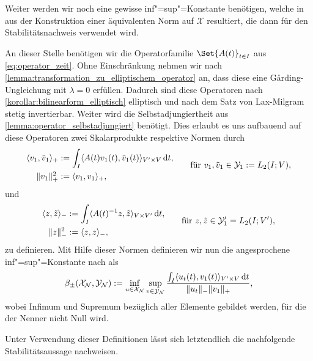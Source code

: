 \documentclass[../main.tex]{subfiles}
\begin{document}
Weiter werden wir noch eine gewisse inf"=sup"=Konstante benötigen, welche in \cite[57]{Andreev:2012ep} aus der Konstruktion einer äquivalenten Norm auf $\mathcal X$ resultiert, die dann für den Stabilitätsnachweis \cite[Theorem 5.2.6]{Andreev:2012ep} verwendet wird.

An dieser Stelle benötigen wir die Operatorfamilie $\Set{A(t)}_{t \in I}$ aus \cref{eq:operator_zeit}.
Ohne Einschränkung nehmen wir nach \cref{lemma:transformation_zu_elliptischem_operator} an, dass diese eine G\aa{}rding-Ungleichung mit $\lambda = 0$ erfüllen.
Dadurch sind diese Operatoren nach \cref{korollar:bilinearform_elliptisch} elliptisch und nach dem Satz von Lax-Milgram \cite[Section 6.2.1]{evans2010partial} stetig invertierbar.
Weiter wird die Selbstadjungiertheit aus \cref{lemma:operator_selbstadjungiert} benötigt.
Dies erlaubt es uns aufbauend auf diese Operatoren zwei Skalarprodukte respektive Normen durch
\begin{equation}
    \begin{aligned}
        \langle v_{1},\tilde{v}_{1}\rangle_{+} &:= \int_{I} \langle A(t)v_{1}(t),\tilde{v}_{1}(t)\rangle_{V' \times V} \mathop{}\!\mathrm{d} t, \\
         \lVert v_{1}\rVert^{2}_{+} &:= \langle v_{1},v_{1}\rangle_{+},
    \end{aligned}
    \qquad \text{für } v_{1}, \tilde{v}_{1} \in \mathcal Y_{1} := L_{2}(I; V),
\end{equation}
und
\begin{equation}
    \begin{aligned}
        \langle z,\tilde{z}\rangle_{-} &:= \int_{I} \langle A(t)^{-1} z,\tilde z\rangle_{V \times V'} \mathop{}\!\mathrm{d} t, \\
        \lVert z\rVert_{-}^{2} &:= \langle z,z\rangle_{-},
    \end{aligned}
    \qquad \text{für } z, \tilde z \in \mathcal Y_{1}' = L_{2}(I; V'),
\end{equation}
zu definieren.
Mit Hilfe dieser Normen definieren wir nun die angesprochene inf"=sup"=Konstante nach \cite[57]{Andreev:2012ep} als
\begin{equation}
    \beta_{\pm}(\mathcal X_{\mathcal N}, \mathcal Y_{\mathcal N}) := \inf_{u \in \mathcal X_{\mathcal N}} \sup_{v \in \mathcal Y_{\mathcal N}} \frac{\int_{I} \langle u_t(t),v_{1}(t)\rangle_{V' \times V} \mathop{}\!\mathrm{d} t}{\lVert u_t\rVert_{-} \lVert v_{1}\rVert_{+}},
\end{equation}
wobei Infimum und Supremum bezüglich aller Elemente gebildet werden, für die der Nenner nicht Null wird.

Unter Verwendung dieser Definitionen lässt sich letztendlich die nachfolgende Stabilitätsaussage nachweisen.
\end{document}
